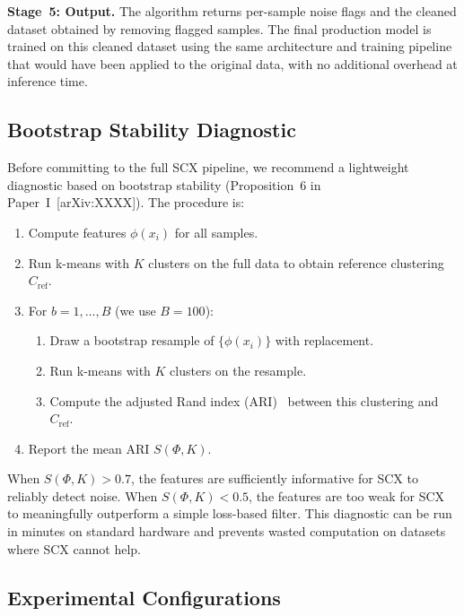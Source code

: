 \textbf{Stage~5: Output.} The algorithm returns per-sample noise flags and the cleaned dataset obtained by removing flagged samples. The final production model is trained on this cleaned dataset using the same architecture and training pipeline that would have been applied to the original data, with no additional overhead at inference time.

\subsection{Bootstrap Stability Diagnostic}

Before committing to the full SCX pipeline, we recommend a lightweight diagnostic based on bootstrap stability (Proposition~6 in Paper~I~[arXiv:XXXX]). The procedure is:

\begin{enumerate}
    \item Compute features $\phi(x_i)$ for all samples.
    \item Run k-means with $K$ clusters on the full data to obtain reference clustering $C_{\text{ref}}$.
    \item For $b = 1, \ldots, B$ (we use $B = 100$):
    \begin{enumerate}
        \item Draw a bootstrap resample of $\{\phi(x_i)\}$ with replacement.
        \item Run k-means with $K$ clusters on the resample.
        \item Compute the adjusted Rand index (ARI)~\cite{hubert1985comparing} between this clustering and $C_{\text{ref}}$.
    \end{enumerate}
    \item Report the mean ARI $S(\Phi, K)$.
\end{enumerate}

When $S(\Phi, K) > 0.7$, the features are sufficiently informative for SCX to reliably detect noise. When $S(\Phi, K) < 0.5$, the features are too weak for SCX to meaningfully outperform a simple loss-based filter. This diagnostic can be run in minutes on standard hardware and prevents wasted computation on datasets where SCX cannot help.

\subsection{Experimental Configurations}

